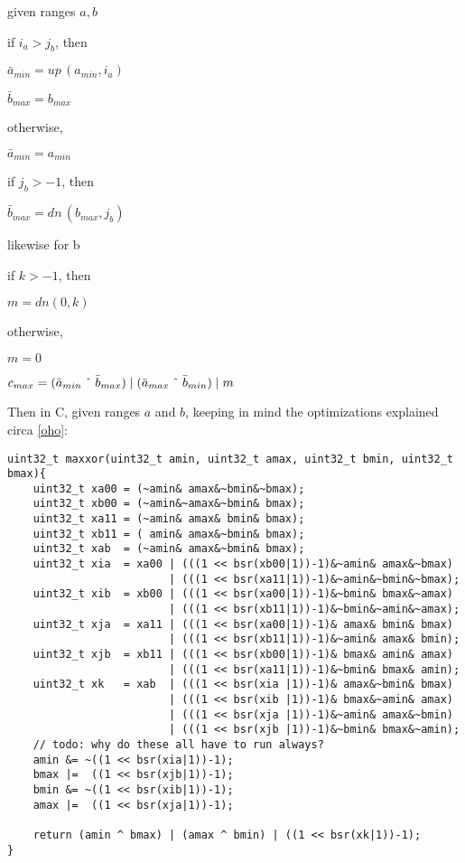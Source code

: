 \documentclass{article}
\begin{document}
given ranges $a,b$

if $i_a > j_b$, then

\quad $\bar a_{min} = up\,(a_{min},i_a) $

\quad $\bar b_{max} = b_{max}$

otherwise,

\quad $\bar a_{min} = a_{min} $

\quad if $j_b > -1$, then

\quad\quad $\bar b_{max} = dn\,(b_{max},j_b) $

likewise for b

if $k > -1$, then

\quad $m = dn(0,k)$

otherwise,

\quad $m = 0$

$c_{max} = (\bar a_{min} \; \text{\^{}} \; \bar b_{max})\;|\;(\bar a_{max} \; 
\text{\^{}} \; \bar b_{min})\;|\; m $

\vspace{10pt}

Then in C, given ranges $a$ and $b$,
keeping in mind the optimizations explained circa \ref{oho}:

\begin{lstlisting}
uint32_t maxxor(uint32_t amin, uint32_t amax, uint32_t bmin, uint32_t bmax){
    uint32_t xa00 = (~amin& amax&~bmin&~bmax);
    uint32_t xb00 = (~amin&~amax&~bmin& bmax);
    uint32_t xa11 = (~amin& amax& bmin& bmax);
    uint32_t xb11 = ( amin& amax&~bmin& bmax);
    uint32_t xab  = (~amin& amax&~bmin& bmax);
    uint32_t xia  = xa00 | (((1 << bsr(xb00|1))-1)&~amin& amax&~bmax) 
                         | (((1 << bsr(xa11|1))-1)&~amin&~bmin&~bmax);
    uint32_t xib  = xb00 | (((1 << bsr(xa00|1))-1)&~bmin& bmax&~amax) 
                         | (((1 << bsr(xb11|1))-1)&~bmin&~amin&~amax);
    uint32_t xja  = xa11 | (((1 << bsr(xa00|1))-1)& amax& bmin& bmax) 
                         | (((1 << bsr(xb11|1))-1)&~amin& amax& bmin);
    uint32_t xjb  = xb11 | (((1 << bsr(xb00|1))-1)& bmax& amin& amax) 
                         | (((1 << bsr(xa11|1))-1)&~bmin& bmax& amin);
    uint32_t xk   = xab  | (((1 << bsr(xia |1))-1)& amax&~bmin& bmax)
                         | (((1 << bsr(xib |1))-1)& bmax&~amin& amax)
                         | (((1 << bsr(xja |1))-1)&~amin& amax&~bmin)
                         | (((1 << bsr(xjb |1))-1)&~bmin& bmax&~amin);
    // todo: why do these all have to run always?
    amin &= ~((1 << bsr(xia|1))-1);
    bmax |=  ((1 << bsr(xjb|1))-1);
    bmin &= ~((1 << bsr(xib|1))-1);
    amax |=  ((1 << bsr(xja|1))-1);

    return (amin ^ bmax) | (amax ^ bmin) | ((1 << bsr(xk|1))-1);
}
\end{lstlisting}
\end{document}
